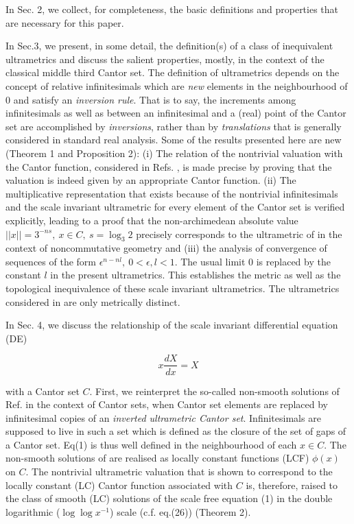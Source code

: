 \documentclass[12pt]{article}
\begin{document}
In Sec. 2, we collect, for completeness,  the basic definitions and properties that are necessary for this paper. 

\vspace{.25cm}

In Sec.3, we present, in some detail, the definition(s) of a class of inequivalent ultrametrics \cite{sd1,sd2,ad} and discuss the salient properties, mostly, in the context of the classical middle third Cantor set. The definition of ultrametrics depends on the concept of relative infinitesimals which are {\em new} elements in the neighbourhood of 0 and satisfy an {\em inversion rule}. That is to say, the increments among infinitesimals as well as between an infinitesimal and a (real) point of the Cantor set are accomplished by {\em inversions}, rather than by {\em translations} that is generally considered in standard real analysis. Some of the results presented here are new (Theorem 1 and Proposition 2): (i) The relation of  the nontrivial valuation with the Cantor function, considered in Refs. \cite{sd1, sd2}, is made precise by proving that the valuation is indeed given by  an appropriate Cantor function. (ii) The multiplicative representation that exists because of the nontrivial infinitesimals and the scale invariant ultrametric for every element of the Cantor set is verified explicitly, leading to a proof that the non-archimedean absolute value $||x||=3^{-ns}, \ x\in C, \ s=\log_3 2$ precisely corresponds to the ultrametric of \cite{pb} in the context of noncommutative geometry and (iii) the analysis of convergence of sequences of the form $\epsilon^{n-nl}, \ 0<\epsilon, l<1 $. The usual limit 0 is replaced by the constant $l$ in the present ultrametrics. This establishes the metric as well as the topological inequivalence of these scale invariant ultrametrics. The ultrametrics considered in \cite{pb} are only metrically distinct.

\vspace{.25cm}

In Sec. 4, we discuss the relationship of the scale invariant differential equation (DE)

\begin{equation}\label{eq1}
x\frac{dX}{dx}=X
\end{equation}

\noindent with a Cantor set $C$. First, we reinterpret the so-called non-smooth solutions of Ref.\cite{dp1, dp2} in the context of Cantor sets, when Cantor set elements are replaced by infinitesimal copies of an {\em inverted ultrametric Cantor set}. Infinitesimals are supposed to live in such a set which is defined as the closure of the set of gaps of a Cantor set. Eq(1) is thus well defined in the neighbourhood of each $x\in C$. The non-smooth solutions of \cite{dp2} are realised as locally constant functions (LCF) $\phi(x)$ on $C$. The nontrivial ultrametric valuation that is shown to correspond to the locally constant (LC) Cantor function associated with $C$ is, therefore, raised to the class of smooth (LC) solutions of the scale free equation (1) in the double logarithmic ($\log\log x^{-1}$) scale (c.f. eq.(26)) (Theorem 2). 
\end{document}
